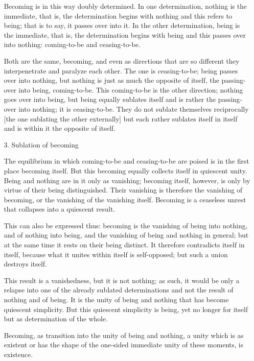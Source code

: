 Becoming is in this way doubly determined.
In one determination, nothing is the immediate,
that is, the determination begins with nothing
and this refers to being;
that is to say, it passes over into it.
In the other determination, being is the immediate,
that is, the determination begins with being
and this passes over into nothing:
coming-to-be and ceasing-to-be.

Both are the same, becoming,
and even as directions that are so different
they interpenetrate and paralyze each other.
The one is ceasing-to-be;
being passes over into nothing,
but nothing is just as much the opposite of itself,
the passing-over into being, coming-to-be.
This coming-to-be is the other direction;
nothing goes over into being,
but being equally sublates itself
and is rather the passing-over into nothing;
it is ceasing-to-be.
They do not sublate themselves reciprocally
[the one sublating the other externally]
but each rather sublates itself in itself
and is within it the opposite of itself.

3. Sublation of becoming

The equilibrium in which coming-to-be and ceasing-to-be are poised
is in the first place becoming itself.
But this becoming equally collects itself in quiescent unity.
Being and nothing are in it only as vanishing;
becoming itself, however, is only by virtue of their being distinguished.
Their vanishing is therefore the vanishing of becoming,
or the vanishing of the vanishing itself.
Becoming is a ceaseless unrest that collapses into a quiescent result.

This can also be expressed thus:
becoming is the vanishing of being into nothing,
and of nothing into being,
and the vanishing of being and nothing in general;
but at the same time it rests on their being distinct.
It therefore contradicts itself in itself,
because what it unites within itself is self-opposed;
but such a union destroys itself.

This result is a vanishedness, but it is not nothing;
as such, it would be only a relapse into one of
the already sublated determinations
and not the result of nothing and of being.
It is the unity of being and nothing
that has become quiescent simplicity.
But this quiescent simplicity is being,
yet no longer for itself but as determination of the whole.

Becoming, as transition into
the unity of being and nothing,
a unity which is as existent
or has the shape of the one-sided
immediate unity of these moments,
is existence.


